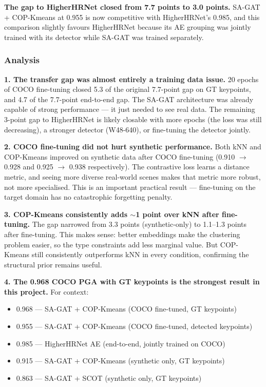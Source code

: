 \vspace{0.5em}

\textbf{The gap to HigherHRNet closed from 7.7 points to 3.0 points.} SA-GAT + COP-Kmeans at 0.955 is now competitive with HigherHRNet's 0.985, and this comparison slightly favours HigherHRNet because its AE grouping was jointly trained with its detector while SA-GAT was trained separately.

\subsubsection{Analysis}

\textbf{1. The transfer gap was almost entirely a training data issue.} 20 epochs of COCO fine-tuning closed 5.3 of the original 7.7-point gap on GT keypoints, and 4.7 of the 7.7-point end-to-end gap. The SA-GAT architecture was already capable of strong performance --- it just needed to see real data. The remaining 3-point gap to HigherHRNet is likely closable with more epochs (the loss was still decreasing), a stronger detector (W48-640), or fine-tuning the detector jointly.

\textbf{2. COCO fine-tuning did not hurt synthetic performance.} Both kNN and COP-Kmeans improved on synthetic data after COCO fine-tuning (0.910 $\to$ 0.928 and 0.925 $\to$ 0.938 respectively). The contrastive loss learns a distance metric, and seeing more diverse real-world scenes makes that metric more robust, not more specialised. This is an important practical result --- fine-tuning on the target domain has no catastrophic forgetting penalty.

\textbf{3. COP-Kmeans consistently adds $\sim$1 point over kNN after fine-tuning.} The gap narrowed from 3.3 points (synthetic-only) to 1.1--1.3 points after fine-tuning. This makes sense: better embeddings make the clustering problem easier, so the type constraints add less marginal value. But COP-Kmeans still consistently outperforms kNN in every condition, confirming the structural prior remains useful.

\textbf{4. The 0.968 COCO PGA with GT keypoints is the strongest result in this project.} For context:
\begin{itemize}
    \item 0.968 --- SA-GAT + COP-Kmeans (COCO fine-tuned, GT keypoints)
    \item 0.955 --- SA-GAT + COP-Kmeans (COCO fine-tuned, detected keypoints)
    \item 0.985 --- HigherHRNet AE (end-to-end, jointly trained on COCO)
    \item 0.915 --- SA-GAT + COP-Kmeans (synthetic only, GT keypoints)
    \item 0.863 --- SA-GAT + SCOT (synthetic only, GT keypoints)
\end{itemize}

